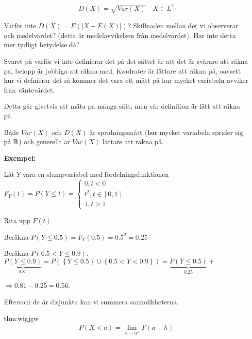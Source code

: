 \begin{equation*}
  \begin{gathered}
    D(X) = \sqrt{Var(X)}\quad X\in L^2
  \end{gathered}
\end{equation*}
\par\bigskip
\noindent Varför inte $D(X) = E(\left|X-E(X)\right|)$? Skillnaden mellan det vi observerar och medelvärdet? (detta är medelavvikelsen från medelvärdet). Har inte detta mer tydligt betydelse då?
\par\bigskip
\noindent Svaret på varför vi inte definierar det på det sättet är att det är svårare att räkna på, belopp är jobbiga att räkna med. Kvadrater är lättare att räkna på, oavsett hur vi defnierar det så kommer det vara ett mått på hur mycket variabeln avviker från väntevärdet.
\par\bigskip
\noindent Detta går givetvis att mäta på många sätt, men vår definition är lätt att räkna på.
\par\bigskip
\noindent Både $Var(X)$ och $D(X)$ är spridningsmått (hur mycket variabeln sprider sig på $\mathbb{R}$) och generellt är $Var(X)$ lättare att räkna på.
\par\bigskip
\noindent\textbf{Exempel:}\par
\noindent Låt $Y$ vara en slumpvariabel med fördelningsfunktionen $F_Y(t)=P(Y\leq t) = \begin{cases}0,t<0\\t^2, t\in[0,1]\\1, t>1\end{cases}$
\par\bigskip
\noindent Rita upp $F(t)$\par
\noindent Beräkna $P(Y\leq 0.5) = F_Y(0.5) = 0.5^2=0.25$\par
\noindent Beräkna $P(0.5<Y\leq 0.9)$. $\underbrace{P(Y\leq 0.9)}_{\text{0.81}} = P(\left\{Y\leq 0.5\right\}\cup\left\{0.5<Y<0.9\right\}) = \underbrace{P(Y\leq0.5)}_{\text{0.25}}+$\par\noindent$\Rightarrow 0.81-0.25=0.56$.\par
\noindent Eftersom de är disjunkta kan vi summera sannolikheterna.
\par\bigskip
\begin{theo}{thm:wigjgw}
  \begin{equation*}
    \begin{gathered}
      P(X<a)=\lim_{h\to0^+}F(a-h)
    \end{gathered}
  \end{equation*}
\end{theo}
